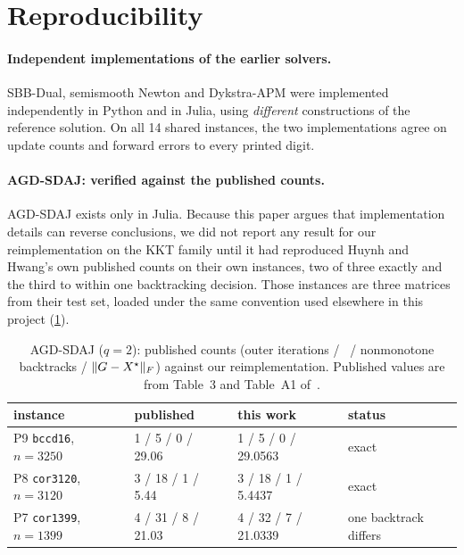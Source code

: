 \section{Reproducibility}\label{sec:repro}

\paragraph{Independent implementations of the earlier solvers.}
SBB-Dual, semismooth Newton and Dykstra-APM were implemented independently in
Python and in Julia, using \emph{different} constructions of the reference
solution. On all 14 shared instances, the two implementations agree on update
counts and forward errors to every printed digit.

\paragraph{AGD-SDAJ: verified against the published counts.}
AGD-SDAJ exists only in Julia. Because this paper argues that implementation
details can reverse conclusions, we did not report any result for our
reimplementation on the KKT family until it had reproduced Huynh and Hwang's
own published counts on their own instances, two of three exactly and the
third to within one backtracking decision. Those instances are three
matrices from their test set, loaded under the same convention used elsewhere
in this project (\cref{tab:agd-verify}).

\begin{table}[t]
\centering
\caption{AGD-SDAJ ($q=2$): published counts (outer iterations / \EVDs\ /
nonmonotone backtracks / $\lVert G-X^\star\rVert_F$) against our reimplementation.
Published values are from Table~3 and Table~A1 of~\cite{huynh2025accelerated}.}
\label{tab:agd-verify}
\small
\begin{tabular}{llll}
\toprule
instance & published & this work & status\\
\midrule
P9 \texttt{bccd16}, $n=3250$  & 1 / 5 / 0 / 29.06  & 1 / 5 / 0 / 29.0563 & exact\\
P8 \texttt{cor3120}, $n=3120$ & 3 / 18 / 1 / 5.44  & 3 / 18 / 1 / 5.4437 & exact\\
P7 \texttt{cor1399}, $n=1399$ & 4 / 31 / 8 / 21.03 & 4 / 32 / 7 / 21.0339 & one backtrack differs\\
\bottomrule
\end{tabular}
\end{table}

